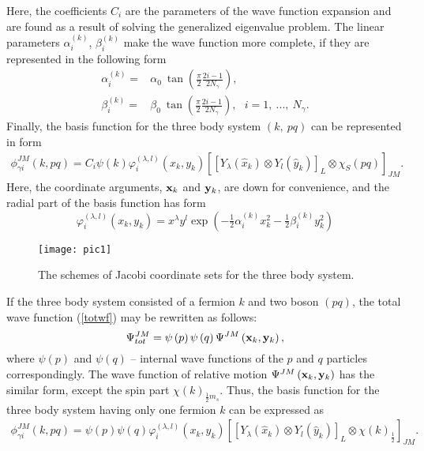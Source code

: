 \documentclass[
12pt, %
oneside, %
english, %
onehalfspacing, %
onehalfspacing, %
headsepline, %
]{MastersDoctoralThesis} %
\begin{document}
Here, the coefficients $ C_{i} $ are the parameters of the wave function expansion and are found as a result of solving the generalized eigenvalue problem. 
The linear parameters  $ \alpha^{(k)} _ {i} $, $ \beta^{(k)}_{i}$ 
make the wave function more complete, if they are represented in the following form
\begin{align}
\alpha^{(k)} _ {i} =& \alpha_0~ \tan 
\left( \frac{\pi}{2} \frac{2i-1}{2N_{\gamma}} \right),
  \\
\beta^{(k)} _ {i} =& \beta_0~  \tan 
\left( \frac{\pi}{2} \frac{2i-1}{2N_{\gamma}} \right),
~~~ i=1,~...,~N_{\gamma}.
\end{align}
Finally, the basis function for the three body system $(k,~pq)$ can be represented in form 
\begin{align}
\phi^{ J M}_{\gamma i} \left(k, pq \right)=
C_i \psi \left( k \right) 
 \varphi^{(\lambda,l)}_i(x_k,y_k) \left[ \left[ 
Y_\lambda \left(\hat{x}_k \right) \otimes Y_l \left(\hat{y}_k \right)
\right]_{L} \otimes \chi_S (pq) \right]_{JM}.
\label{basis_function_1}
\end{align}
Here, the coordinate arguments, ${\bf x}_k$ and ${\bf y}_k$,   are down for convenience, and the radial part of the basis function has form
\begin{equation}
\varphi^{(\lambda,l)}_i(x_k,y_k)=
  x^\lambda y^l \exp\left( - \tfrac{1}{2} \alpha_i^{(k)} x^2_k - \tfrac{1}{2} \beta_i^{(k)} y^2_k \right)
\end{equation}

\begin{figure}[b]
\centering
\texttt{[image: pic1]}
\decoRule
\caption{\footnotesize The schemes of Jacobi coordinate sets for the three body system.}
\label{fig:jacobiSet}
\end{figure}

If the three body system consisted of a fermion $k$ and two boson $(pq)$, the total wave function (\ref{totwf}) may be rewritten as follows:
\begin{equation}
\Psi^{JM}_{tot} 
 = \psi\left( p \right) 
 \psi\left( q \right) 
 \Psi^{JM}\left( {\bf x}_k, {\bf y}_k \right),
\end{equation} 
where $\psi\left( p \right)$ and $\psi\left( q \right) $ -- internal wave functions of the $p$ and $q$ particles correspondingly.
The wave function of relative motion $\Psi^{JM}\left( {\bf x}_k, {\bf y}_k \right)$ has the similar form, except the spin part $\chi(k)_{\tfrac{1}{2}m_s}$. Thus, the basis function for the three body system having only one fermion $k$ can be expressed as
\begin{align}
\phi^{ J M}_{\gamma i} \left(k, pq \right)=
\psi\left( p \right) 
 \psi\left( q \right) 
\varphi^{(\lambda,l)}_i(x_k,y_k) 
 \left[ \left[ 
Y_\lambda \left(\hat{x}_k \right) \otimes Y_l \left(\hat{y}_k \right)
\right]_{L} \otimes \chi(k)_{\tfrac{1}{2}} \right]_{JM}.
\label{basis_function_2}
\end{align}
\end{document}
